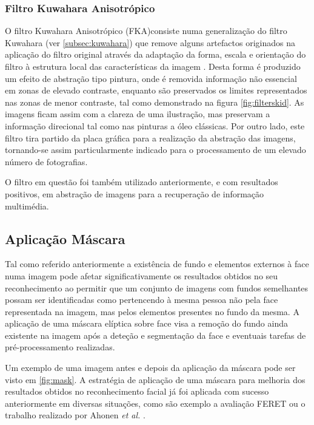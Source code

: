 \subsubsection*{Filtro Kuwahara Anisotrópico}
O filtro Kuwahara Anisotrópico (FKA)consiste numa generalização do filtro Kuwahara (ver \ref{subsec:kuwahara}) que remove alguns artefactos originados na aplicação do filtro original através da adaptação da forma, escala e orientação do filtro à estrutura local das características da imagem \cite{Kyprianidis2009}. Desta forma é produzido um efeito de abstração tipo pintura, onde é removida informação não essencial em zonas de elevado contraste, enquanto são preservados os limites representados nas zonas de menor contraste, tal como demonstrado na figura \ref{fig:filterskid}. As imagens ficam assim com a clareza de uma ilustração, mas preservam a informação direcional tal como nas pinturas a óleo clássicas. Por outro lado, este filtro tira partido da placa gráfica para a realização da abstração das imagens, tornando-se assim particularmente indicado para o processamento de um elevado número de fotografias.

O filtro em questão foi também utilizado anteriormente, e com resultados positivos, em abstração de imagens para a recuperação de informação multimédia. 

\subsection{Aplicação Máscara}
Tal como referido anteriormente a existência de fundo e elementos externos à face numa imagem pode afetar significativamente os resultados obtidos no seu reconhecimento ao permitir que um conjunto de imagens com fundos semelhantes possam ser identificadas como pertencendo à mesma pessoa não pela face representada na imagem, mas pelos elementos presentes no fundo da mesma. A aplicação de uma máscara elíptica sobre face visa a remoção do fundo ainda existente na imagem após a deteção e segmentação da face e eventuais tarefas de pré-processamento realizadas.

Um exemplo de uma imagem antes e depois da aplicação da máscara pode ser visto em \ref{fig:mask}. A estratégia de aplicação de uma máscara para melhoria dos resultados obtidos no reconhecimento facial já foi aplicada com sucesso anteriormente em diversas situações, como são exemplo a avaliação FERET \cite{Phillips2000} ou o trabalho realizado por Ahonen \textit{et al.} \cite{ahonen2004face}.

